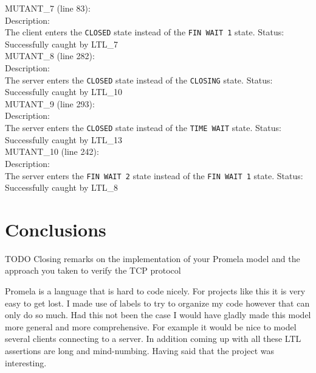 \documentclass{WigReport}
\begin{document}
MUTANT\_7 (line 83):\\
Description:\\
The client enters the \verb|CLOSED| state instead of the \verb|FIN WAIT 1| state.
Status: Successfully caught by LTL\_7
\\

MUTANT\_8 (line 282):\\
Description:\\
The server enters the \verb|CLOSED| state instead of the \verb|CLOSING| state.
Status: Successfully caught by LTL\_10
\\

MUTANT\_9 (line 293):\\
Description:\\
The server enters the \verb|CLOSED| state instead of the \verb|TIME WAIT| state.
Status: Successfully caught by LTL\_13
\\

MUTANT\_10 (line 242):\\
Description:\\
The server enters the \verb|FIN WAIT 2| state instead of the \verb|FIN WAIT 1| state.
Status: Successfully caught by LTL\_8
\\

\section{Conclusions}

TODO Closing remarks on the implementation of your Promela model and the approach you taken to verify the TCP protocol

Promela is a language that is hard to code nicely. For projects like this it is very easy to get lost. I made use of labels to try to organize my code however that can only do so much. Had this not been the case I would have gladly made this model more general and more comprehensive. For example it would be nice to model several clients connecting to a server. In addition coming up with all these LTL assertions are long and mind-numbing. Having said that the project was interesting.
\end{document}
